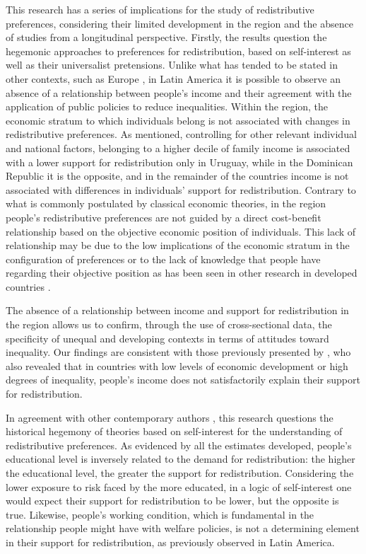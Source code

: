\documentclass[utf8]{frontiersSCNS} %
\begin{document}
This research has a series of implications for the study of redistributive preferences, considering their limited development in the region and the absence of studies from a longitudinal perspective. Firstly, the results question the hegemonic approaches to preferences for redistribution, based on self-interest as well as their universalist pretensions. Unlike what has tended to be stated in other contexts, such as Europe \parencite{Schmidt-CatranEconomicinequalitypublic2016}, in Latin America it is possible to observe an absence of a relationship between people’s income and their agreement with the application of public policies to reduce inequalities. Within the region, the economic stratum to which individuals belong is not associated with changes in redistributive preferences. As mentioned, controlling for other relevant individual and national factors, belonging to a higher decile of family income is associated with a lower support for redistribution only in Uruguay, while in the Dominican Republic it is the opposite, and in the remainder of the countries income is not associated with differences in individuals’ support for redistribution. Contrary to what is commonly postulated by classical economic theories, in the region people’s redistributive preferences are not guided by a direct cost-benefit relationship based on the objective economic position of individuals. This lack of relationship may be due to the low implications of the economic stratum in the configuration of preferences or to the lack of knowledge that people have regarding their objective position as has been seen in other research in developed countries \parencite{engelhardt2018germans}.

The absence of a relationship between income and support for redistribution in the region allows us to confirm, through the use of cross-sectional data, the specificity of unequal and developing contexts in terms of attitudes toward inequality. Our findings are consistent with those previously presented by \textcite{DionEconomicDevelopmentIncome2010}, who also revealed that in countries with low levels of economic development or high degrees of inequality, people’s income does not satisfactorily explain their support for redistribution.

In agreement with other contemporary authors \parencite{amable2019new}, this research questions the historical hegemony of theories based on self-interest for the understanding of redistributive preferences. As evidenced by all the estimates developed, people’s educational level is inversely related to the demand for redistribution: the higher the educational level, the greater the support for redistribution. Considering the lower exposure to risk faced by the more educated, in a logic of self-interest one would expect their support for redistribution to be lower, but the opposite is true. Likewise, people’s working condition, which is fundamental in the relationship people might have with welfare policies, is not a determining element in their support for redistribution, as \textcite{Berensexclusioncalculatingsolidarity2015} previously observed in Latin America.
\end{document}
